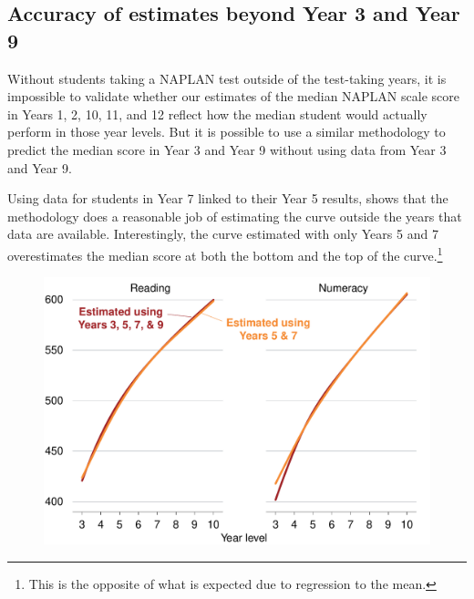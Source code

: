 \subsection{Accuracy of estimates beyond Year 3 and Year 9}

Without students taking a NAPLAN test outside of the test-taking years, it is impossible to validate whether our estimates of the median NAPLAN scale score in Years 1, 2, 10, 11, and 12 reflect how the median student would actually perform in those year levels. But it is possible to use a similar methodology to predict the median score in Year 3 and Year 9 without using data from Year 3 and Year 9.

Using data for students in Year 7 linked to their Year 5 results,  shows that the methodology does a reasonable job of estimating the curve outside the years that data are available. Interestingly, the curve estimated with only Years 5 and 7 overestimates the median score at both the bottom and the top of the curve.\footnote{This is the opposite of what is expected due to regression to the mean.} 

\begin{figure}[t]
 \includegraphics[width=\columnwidth]{atlas/five_seven.pdf}\label{fig:57}

\end{figure}

